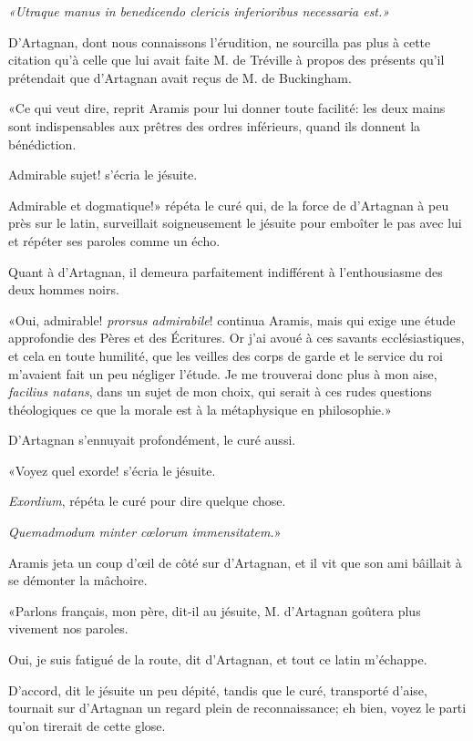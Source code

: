 \textit{«Utraque manus in benedicendo clericis inferioribus necessaria est.»} 

D'Artagnan, dont nous connaissons l'érudition, ne sourcilla pas plus à cette citation qu'à celle que lui avait faite M. de Tréville à propos des présents qu'il prétendait que d'Artagnan avait reçus de M. de Buckingham. 

«Ce qui veut dire, reprit Aramis pour lui donner toute facilité: les deux mains sont indispensables aux prêtres des ordres inférieurs, quand ils donnent la bénédiction. 

\speak  Admirable sujet! s'écria le jésuite. 

\speak  Admirable et dogmatique!» répéta le curé qui, de la force de d'Artagnan à peu près sur le latin, surveillait soigneusement le jésuite pour emboîter le pas avec lui et répéter ses paroles comme un écho. 

Quant à d'Artagnan, il demeura parfaitement indifférent à l'enthousiasme des deux hommes noirs. 

«Oui, admirable! \textit{prorsus admirabile}! continua Aramis, mais qui exige une étude approfondie des Pères et des Écritures. Or j'ai avoué à ces savants ecclésiastiques, et cela en toute humilité, que les veilles des corps de garde et le service du roi m'avaient fait un peu négliger l'étude. Je me trouverai donc plus à mon aise, \textit{facilius natans}, dans un sujet de mon choix, qui serait à ces rudes questions théologiques ce que la morale est à la métaphysique en philosophie.» 

D'Artagnan s'ennuyait profondément, le curé aussi. 

«Voyez quel exorde! s'écria le jésuite. 

\speak  \textit{Exordium}, répéta le curé pour dire quelque chose. 

\speak  \textit{Quemadmodum minter cœlorum immensitatem.}» 

Aramis jeta un coup d'œil de côté sur d'Artagnan, et il vit que son ami bâillait à se démonter la mâchoire. 

«Parlons français, mon père, dit-il au jésuite, M. d'Artagnan goûtera plus vivement nos paroles. 

\speak  Oui, je suis fatigué de la route, dit d'Artagnan, et tout ce latin m'échappe. 

\speak  D'accord, dit le jésuite un peu dépité, tandis que le curé, transporté d'aise, tournait sur d'Artagnan un regard plein de reconnaissance; eh bien, voyez le parti qu'on tirerait de cette glose. 

